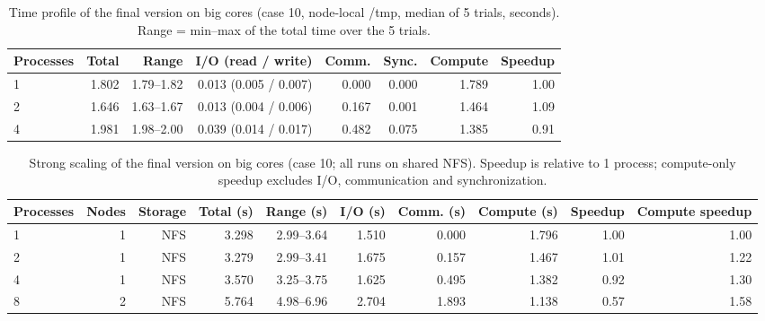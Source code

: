 
\begin{table}[htbp]
\centering
\caption{Time profile of the final version on big cores (case 10, node-local /tmp, median of 5 trials, seconds). Range = min--max of the total time over the 5 trials.}
\label{tab:breakdown}
\begin{tabular}{lrrrrrrr}
\toprule
Processes & Total & Range & I/O (read / write) & Comm. & Sync. & Compute & Speedup \\
\midrule
1 & 1.802 & 1.79--1.82 & 0.013 (0.005 / 0.007) & 0.000 & 0.000 & 1.789 & 1.00 \\
2 & 1.646 & 1.63--1.67 & 0.013 (0.004 / 0.006) & 0.167 & 0.001 & 1.464 & 1.09 \\
4 & 1.981 & 1.98--2.00 & 0.039 (0.014 / 0.017) & 0.482 & 0.075 & 1.385 & 0.91 \\
\bottomrule
\end{tabular}
\end{table}

\begin{table}[htbp]
\centering
\caption{Strong scaling of the final version on big cores (case 10; all runs on shared NFS). Speedup is relative to 1 process; compute-only speedup excludes I/O, communication and synchronization.}
\label{tab:scaling}
\begin{tabular}{lrrrrrrrrr}
\toprule
Processes & Nodes & Storage & Total (s) & Range (s) & I/O (s) & Comm. (s) & Compute (s) & Speedup & Compute speedup \\
\midrule
1 & 1 & NFS & 3.298 & 2.99--3.64 & 1.510 & 0.000 & 1.796 & 1.00 & 1.00 \\
2 & 1 & NFS & 3.279 & 2.99--3.41 & 1.675 & 0.157 & 1.467 & 1.01 & 1.22 \\
4 & 1 & NFS & 3.570 & 3.25--3.75 & 1.625 & 0.495 & 1.382 & 0.92 & 1.30 \\
8 & 2 & NFS & 5.764 & 4.98--6.96 & 2.704 & 1.893 & 1.138 & 0.57 & 1.58 \\
\bottomrule
\end{tabular}
\end{table}

